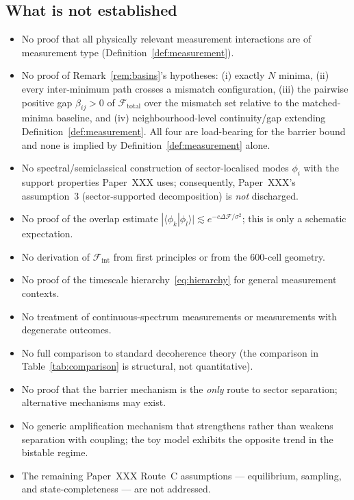 \documentclass[12pt]{article}
\newcommand{\Fcal}{\mathcal{F}}
\begin{document}
\subsection{What is not established}

\begin{itemize}
    \item No proof that all physically relevant measurement interactions are of measurement type (Definition~\ref{def:measurement}).
    \item No proof of Remark~\ref{rem:basins}'s hypotheses: (i) exactly $N$ minima, (ii) every inter-minimum path crosses a mismatch configuration, (iii) the pairwise positive gap $\beta_{ij}>0$ of $\Fcal_{\mathrm{total}}$ over the mismatch set relative to the matched-minima baseline, and (iv) neighbourhood-level continuity/gap extending Definition~\ref{def:measurement}. All four are load-bearing for the barrier bound and none is implied by Definition~\ref{def:measurement} alone.
    \item No spectral/semiclassical construction of sector-localised modes $\phi_i$ with the support properties Paper~XXX uses; consequently, Paper~XXX's assumption~3 (sector-supported decomposition) is \emph{not} discharged.
    \item No proof of the overlap estimate $|\langle\phi_k|\phi_l\rangle| \lesssim e^{-c\Delta\Fcal/\sigma^2}$; this is only a schematic expectation.
    \item No derivation of $\Fcal_{\mathrm{int}}$ from first principles or from the 600-cell geometry.
    \item No proof of the timescale hierarchy~\eqref{eq:hierarchy} for general measurement contexts.
    \item No treatment of continuous-spectrum measurements or measurements with degenerate outcomes.
    \item No full comparison to standard decoherence theory (the comparison in Table~\ref{tab:comparison} is structural, not quantitative).
    \item No proof that the barrier mechanism is the \textit{only} route to sector separation; alternative mechanisms may exist.
    \item No generic amplification mechanism that strengthens rather than weakens separation with coupling; the toy model exhibits the opposite trend in the bistable regime.
    \item The remaining Paper~XXX Route~C assumptions --- equilibrium, sampling, and state-completeness --- are not addressed.
\end{itemize}
\end{document}
